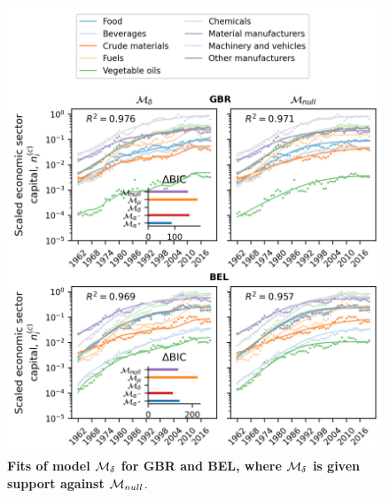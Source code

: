 \FloatBarrier
\begin{figure}
  \center
  \includegraphics{figures/SI/figure_delta_simulate.png}
  \caption{\small \textbf{Fits of model $\mathcal{M}_\delta$ for GBR and BEL, where $\mathcal{M}_\delta$ is given support against $\mathcal{M}_{null}$}. 
   }\label{figSI:fit_delta}
\end{figure}

